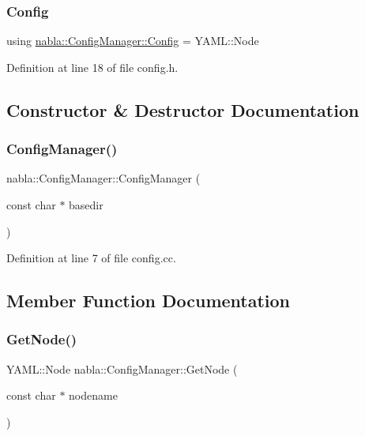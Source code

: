 \subsubsection{\texorpdfstring{Config}{Config}}
{\footnotesize\ttfamily using \mbox{\hyperlink{classnabla_1_1_config_manager_a5d11666f077c13edacfb28d2740d0c3c}{nabla\+::\+Config\+Manager\+::\+Config}} =  Y\+A\+M\+L\+::\+Node}



Definition at line 18 of file config.\+h.



\subsection{Constructor \& Destructor Documentation}
\mbox{\label{classnabla_1_1_config_manager_a4b294db3e540397228a75723b6d19b63}} 
\subsubsection{\texorpdfstring{ConfigManager()}{ConfigManager()}}
{\footnotesize\ttfamily nabla\+::\+Config\+Manager\+::\+Config\+Manager (\begin{DoxyParamCaption}\item[{const char $\ast$}]{basedir }\end{DoxyParamCaption})}



Definition at line 7 of file config.\+cc.



\subsection{Member Function Documentation}
\mbox{\label{classnabla_1_1_config_manager_ac20c088af8a93d3bf44fa2d85bcba3d1}} 
\subsubsection{\texorpdfstring{GetNode()}{GetNode()}}
{\footnotesize\ttfamily Y\+A\+M\+L\+::\+Node nabla\+::\+Config\+Manager\+::\+Get\+Node (\begin{DoxyParamCaption}\item[{const char $\ast$}]{nodename }\end{DoxyParamCaption})\hspace{0.3cm}{\ttfamily [inline]}}



